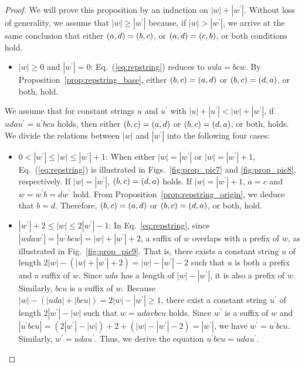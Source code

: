 \begin{proof}
We will prove this proposition by an induction on $|w| + |w^{\prime}|$.
Without loss of generality, we assume that $|w| \geq |w^{\prime}|$ because, if $|w| > |w^{\prime}|$, we arrive at the same conclusion that either $(a,d) = (b,c)$, or $(a,d) = (c,b)$, or both conditions hold.
\begin{itemize}
  \item $|w| \geq 0$ and $|w^{\prime}|=0$:
  Eq.~(\ref{eq:repstring}) reduces to $wda = bcw$. By Proposition~\ref{prop:repstring_base}, either $(b,c) = (a,d)$ or $(b,c) = (d,a)$, or both, hold.
\end{itemize}
We assume that for constant strings $u$ and $u^{\prime}$ with $|u| + |u^{\prime}| < |w| + |w^{\prime}|$, if $udau^{\prime} = u^{\prime}bcu$ holds, then either $(b,c) = (a,d)$ or $(b,c) = (d,a)$, or both, holds.
We divide the relations between $|w|$ and $|w^{\prime}|$ into the following four cases:
\begin{itemize}
\item $0 < |w^{\prime}| \le |w| \le |w^{\prime}|+1$:
When either $|w|=|w^{\prime}|$ or $|w|=|w^{\prime}|+1$, Eq.~(\ref{eq:repstring}) is illustrated in Figs.~\ref{fig:prop_pic7} and \ref{fig:prop_pic8}, respectively.
If $|w|=|w^{\prime}|$, $(b,c) = (d,a)$ holds.
If $|w|=|w^{\prime}|+1$, $a = c$ and $w = w^{\prime}b = dw^{\prime}$ hold.
From Proposition~\ref{prop:repstring_origin}, we deduce that $b = d$.
Therefore, $(b,c) = (a,d)$ or $(b,c) = (d,a)$, or both, hold.
%
\item $|w^{\prime}|+2 \le |w| \le 2|w^{\prime}| - 1$:
In Eq.~\ref{eq:repstring}, since $|wdaw^{\prime}| = |w^{\prime}bcw| = |w| + |w^{\prime}| + 2$, a suffix of $w$ overlaps with a prefix of $w$, as illustrated in Fig.~\ref{fig:prop_pic9}.
That is, there exists a constant string $u$ of length $2|w| - (|w| + |w^{\prime}| + 2) = |w| - |w^{\prime}| - 2$ such that $u$ is both a prefix and a suffix of $w$.
Since $uda$ has a length of $|w| - |w^{\prime}|$, it is also a prefix of $w$. Similarly, $bcu$ is a suffix of $w$.
Because $|w| - (|uda| + |bcu|) = 2|w| - |w^{\prime}| \ge 1$, there exist a constant string $u^{\prime}$ of length $2|w^{\prime}| - |w|$ such that $w = udavbcu$ holds.
Since $w^{\prime}$ is a suffix of $w$ and $|u^{\prime}bcu| = (2|w^{\prime}| - |w|) + 2 + (|w| - |w^{\prime}| - 2) = |w^{\prime}|$, we have $w^{\prime} = u^{\prime}bcu$.
Similarly, $w^{\prime} = udau^{\prime}$. Thus, we derive the equation $u^{\prime}bcu = udau^{\prime}$.

\end{itemize}
\end{proof}
